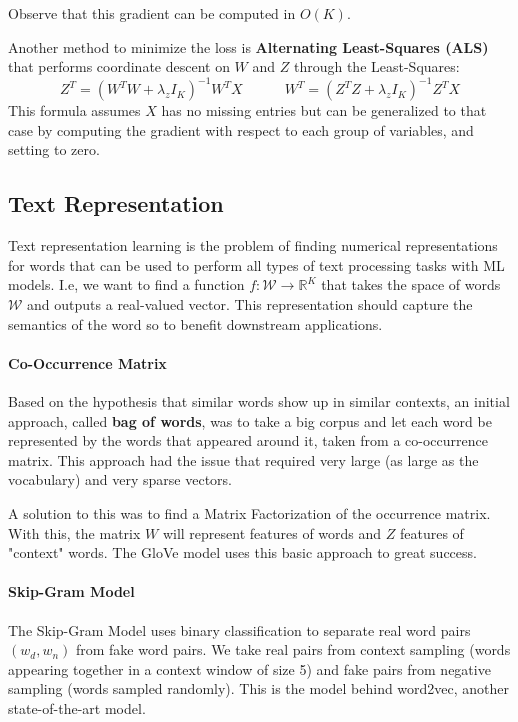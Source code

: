 \documentclass{article}
\newcommand{\R}{\mathbb{R}}
\begin{document}
Observe that this gradient can be computed in $O(K)$.

Another method to minimize the loss is \textbf{Alternating Least-Squares (ALS)} that performs coordinate descent on $W$ and $Z$ through the Least-Squares:
$$
Z^T = (W^T W + \lambda_z I_K)^{-1} W^T X \quad \quad \quad
W^T = (Z^T Z + \lambda_z I_K)^{-1} Z^T X
$$
This formula assumes $X$ has no missing entries but can be generalized to that case by computing the gradient with respect to each group of variables, and setting to zero.

\subsection{Text Representation}

Text representation learning is the problem of finding numerical representations for words that can be used to perform all types of text processing tasks with ML models.
I.e, we want to find a function $f : \mathcal{W} \to \R^K$ that takes the space of words $\mathcal{W}$ and outputs a real-valued vector.
This representation should capture the semantics of the word so to benefit downstream applications.

\paragraph{Co-Occurrence Matrix}

Based on the hypothesis that similar words show up in similar contexts, an initial approach, called \textbf{bag of words}, was to take a big corpus and let each word be represented by the words that appeared around it, taken from a co-occurrence matrix.
This approach had the issue that required very large (as large as the vocabulary) and very sparse vectors.

A solution to this was to find a Matrix Factorization of the occurrence matrix.
With this, the matrix $W$ will represent features of words and $Z$ features of "context" words.
The GloVe model uses this basic approach to great success.

\paragraph{Skip-Gram Model}

The Skip-Gram Model uses binary classification to separate real word pairs $(w_d, w_n)$ from fake word pairs.
We take real pairs from context sampling (words appearing together in a context window of size 5) and fake pairs from negative sampling (words sampled randomly).
This is the model behind word2vec, another state-of-the-art model.
\end{document}
